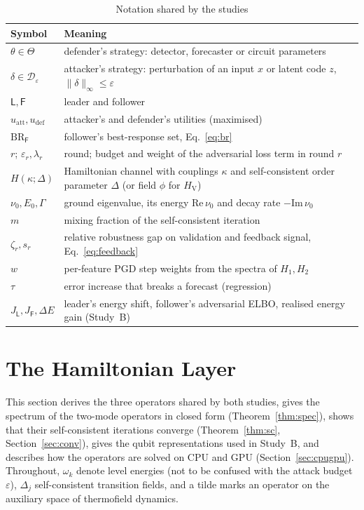 \documentclass[conference]{IEEEtran}
\newcommand{\BR}{\mathrm{BR}}
\newcommand{\HV}{H_{\mathrm{V}}}
\begin{document}
\begin{table}[t]
\centering
\caption{Notation shared by the studies}
\label{tab:notation}
\footnotesize
\setlength{\tabcolsep}{3pt}
\begin{tabular}{@{}>{\raggedright\arraybackslash}p{1.7cm}>{\raggedright\arraybackslash}p{6.6cm}@{}}
\toprule
Symbol & Meaning \\
\midrule
$\theta\in\Theta$ & defender's strategy: detector, forecaster or circuit parameters \\
$\delta\in\mathcal D_\varepsilon$ & attacker's strategy: perturbation of an input $x$ or latent code $z$, $\|\delta\|_\infty\le\varepsilon$ \\
$\mathsf L,\mathsf F$ & leader and follower \\
$u_{\mathrm{att}},u_{\mathrm{def}}$ & attacker's and defender's utilities (maximised) \\
$\BR_{\mathsf F}$ & follower's best-response set, Eq.~\eqref{eq:br} \\
$r$; $\varepsilon_r,\lambda_r$ & round; budget and weight of the adversarial loss term in round $r$ \\
$H(\kappa;\Delta)$ & Hamiltonian channel with couplings $\kappa$ and self-consistent order parameter $\Delta$ (or field $\phi$ for $\HV$) \\
$\nu_0,E_0,\Gamma$ & ground eigenvalue, its energy $\mathrm{Re}\,\nu_0$ and decay rate $-\mathrm{Im}\,\nu_0$ \\
$m$ & mixing fraction of the self-consistent iteration \\
$\zeta_r,s_r$ & relative robustness gap on validation and feedback signal, Eq.~\eqref{eq:feedback} \\
$w$ & per-feature PGD step weights from the spectra of $H_1,H_2$ \\
$\tau$ & error increase that breaks a forecast (regression) \\
$J_{\mathsf L},J_{\mathsf F},\Delta E$ & leader's energy shift, follower's adversarial ELBO, realised energy gain (Study~B) \\
\bottomrule
\end{tabular}
\end{table}

\section{The Hamiltonian Layer}\label{sec:ham}
This section derives the three operators shared by both studies, gives the spectrum of the two-mode operators in closed form (Theorem~\ref{thm:spec}), shows that their self-consistent iterations converge (Theorem~\ref{thm:sc}, Section~\ref{sec:conv}), gives the qubit representations used in Study~B, and describes how the operators are solved on CPU and GPU (Section~\ref{sec:cpugpu}). Throughout, $\omega_k$ denote level energies (not to be confused with the attack budget $\varepsilon$), $\Delta_j$ self-consistent transition fields, and a tilde marks an operator on the auxiliary space of thermofield dynamics.
\end{document}
